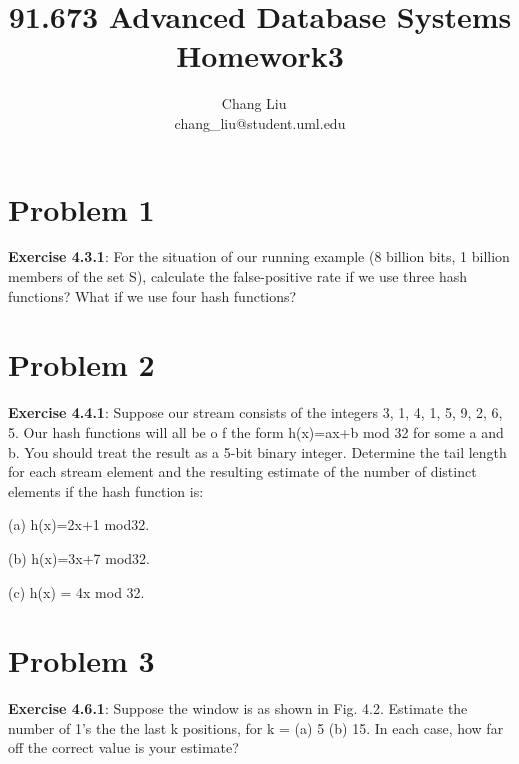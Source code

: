 \documentclass{article}
\author{Chang Liu ~\\ chang\_liu@student.uml.edu}
\title{91.673 Advanced Database Systems Homework3}
\begin{document}
\maketitle

\section{Problem 1}

\textbf{Exercise 4.3.1}: For the situation of our running example (8 billion bits, 1 billion members of the set S), calculate the false-positive rate if we use three hash functions? What if we use four hash functions?


\section{Problem 2}

\textbf{Exercise 4.4.1}: Suppose our stream consists of the integers 3, 1, 4, 1, 5, 9, 2, 6, 5. Our hash functions will all be o f the form h(x)=ax+b mod 32 for some a and b. You should treat the result as a 5-bit binary integer. Determine the tail length for each stream element and the resulting estimate of the number of distinct elements if the hash function is:

(a) h(x)=2x+1 mod32.

(b) h(x)=3x+7 mod32.

(c) h(x) = 4x mod 32.



\section{Problem 3}

\textbf{Exercise 4.6.1}: Suppose the window is as shown in Fig. 4.2. Estimate the number of 1’s the the last k positions, for k = (a) 5 (b) 15. In each case, how far off the correct value is your estimate?
\end{document}
